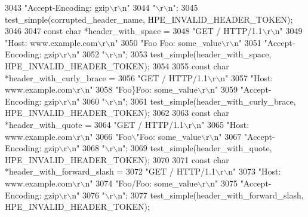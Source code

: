 \begin{DoxyCode}
{{{3043     \textcolor{stringliteral}{"Accept-Encoding: gzip\(\backslash\)r\(\backslash\)n"}
3044     \textcolor{stringliteral}{"\(\backslash\)r\(\backslash\)n"};
3045   test_simple(corrupted\_header\_name, HPE_INVALID_HEADER_TOKEN);
3046 
3047   \textcolor{keyword}{const} \textcolor{keywordtype}{char} *header\_with\_space =
3048     \textcolor{stringliteral}{"GET / HTTP/1.1\(\backslash\)r\(\backslash\)n"}
3049     \textcolor{stringliteral}{"Host: www.example.com\(\backslash\)r\(\backslash\)n"}
3050     \textcolor{stringliteral}{"Foo Foo: some\_value\(\backslash\)r\(\backslash\)n"}
3051     \textcolor{stringliteral}{"Accept-Encoding: gzip\(\backslash\)r\(\backslash\)n"}
3052     \textcolor{stringliteral}{"\(\backslash\)r\(\backslash\)n"};
3053   test_simple(header\_with\_space, HPE_INVALID_HEADER_TOKEN);
3054 
3055   \textcolor{keyword}{const} \textcolor{keywordtype}{char} *header\_with\_curly\_brace =
3056     \textcolor{stringliteral}{"GET / HTTP/1.1\(\backslash\)r\(\backslash\)n"}
3057     \textcolor{stringliteral}{"Host: www.example.com\(\backslash\)r\(\backslash\)n"}
3058     \textcolor{stringliteral}{"Foo\}Foo: some\_value\(\backslash\)r\(\backslash\)n"}
3059     \textcolor{stringliteral}{"Accept-Encoding: gzip\(\backslash\)r\(\backslash\)n"}
3060     \textcolor{stringliteral}{"\(\backslash\)r\(\backslash\)n"};
3061   test_simple(header\_with\_curly\_brace, HPE_INVALID_HEADER_TOKEN);
3062 
3063   \textcolor{keyword}{const} \textcolor{keywordtype}{char} *header\_with\_quote =
3064     \textcolor{stringliteral}{"GET / HTTP/1.1\(\backslash\)r\(\backslash\)n"}
3065     \textcolor{stringliteral}{"Host: www.example.com\(\backslash\)r\(\backslash\)n"}
3066     \textcolor{stringliteral}{"Foo\(\backslash\)"Foo: some\_value\(\backslash\)r\(\backslash\)n"}
3067     \textcolor{stringliteral}{"Accept-Encoding: gzip\(\backslash\)r\(\backslash\)n"}
3068     \textcolor{stringliteral}{"\(\backslash\)r\(\backslash\)n"};
3069   test_simple(header\_with\_quote, HPE_INVALID_HEADER_TOKEN);
3070 
3071   \textcolor{keyword}{const} \textcolor{keywordtype}{char} *header\_with\_forward\_slash =
3072     \textcolor{stringliteral}{"GET / HTTP/1.1\(\backslash\)r\(\backslash\)n"}
3073     \textcolor{stringliteral}{"Host: www.example.com\(\backslash\)r\(\backslash\)n"}
3074     \textcolor{stringliteral}{"Foo/Foo: some\_value\(\backslash\)r\(\backslash\)n"}
3075     \textcolor{stringliteral}{"Accept-Encoding: gzip\(\backslash\)r\(\backslash\)n"}
3076     \textcolor{stringliteral}{"\(\backslash\)r\(\backslash\)n"};
3077   test_simple(header\_with\_forward\_slash, HPE_INVALID_HEADER_TOKEN);
}}}
\end{DoxyCode}
